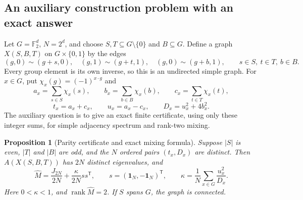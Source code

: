 \documentclass[11pt,a4paper]{article}
\newtheorem{proposition}[theorem]{Proposition}
\theoremstyle{definition}
\theoremstyle{remark}
\begin{document}
\subsection{An auxiliary construction problem with an exact answer}

Let $G=\mathbb F_2^d$, $N=2^d$, and choose
$S,T\subseteq G\setminus\{0\}$ and $B\subseteq G$.
Define a graph $X(S,B,T)$ on $G\times\{0,1\}$ by the edges
\[
 (g,0)\sim(g+s,0),\quad
 (g,1)\sim(g+t,1),\quad
 (g,0)\sim(g+b,1),
 \qquad s\in S,\ t\in T,\ b\in B.
\]
Every group element is its own inverse, so this is an undirected simple
graph. For $x\in G$, put $\chi_x(g)=(-1)^{x\cdot g}$ and
\[
 a_x=\sum_{s\in S}\chi_x(s),\qquad
 b_x=\sum_{b\in B}\chi_x(b),\qquad
 c_x=\sum_{t\in T}\chi_x(t),
\]
\[
 t_x=a_x+c_x,\qquad u_x=a_x-c_x,\qquad
 D_x=u_x^2+4b_x^2.
\]
The auxiliary question is to give an exact finite certificate, using only
these integer sums, for simple adjacency spectrum and rank-two mixing.

\begin{proposition}[Parity certificate and exact mixing formula]
\label{prop:t99certificate}
Suppose $|S|$ is even, $|T|$ and $|B|$ are odd, and the $N$ ordered pairs
$(t_x,D_x)$ are distinct. Then $A(X(S,B,T))$ has $2N$ distinct eigenvalues,
and
\begin{equation}\label{eq:t99mixing}
 \widehat M=\frac{J_{2N}}{2N}+\frac{\kappa}{2N}ss^{\mathsf T},
 \qquad s=(\mathbf1_N,-\mathbf1_N)^{\mathsf T},\qquad
 \kappa=\frac1N\sum_{x\in G}\frac{u_x^2}{D_x}.
\end{equation}
Here $0<\kappa<1$, and $\operatorname{rank}\widehat M=2$.
If $S$ spans $G$, the graph is connected.
\end{proposition}
\end{document}
